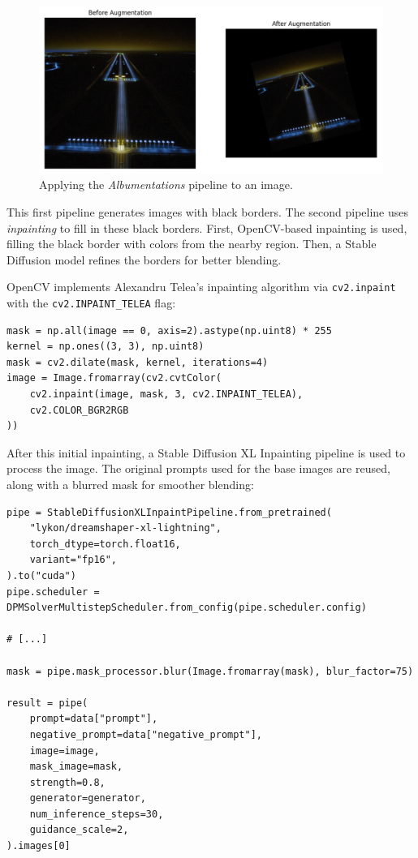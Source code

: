 \begin{figure}[htbp]
\centering
\includegraphics[width=1.0\textwidth]{figures/albumentations.png}
  \caption{Applying the \emph{Albumentations} pipeline to an image.}
\label{fig:noise_to_image}
\end{figure}

This first pipeline generates images with black borders. 
The second pipeline uses \emph{inpainting} to fill in these black borders. 
First, OpenCV-based inpainting is used, filling the black border with colors from the nearby region. 
Then, a Stable Diffusion model refines the borders for better blending.

OpenCV implements Alexandru Telea's inpainting algorithm \cite{telea_image_2004}
via \texttt{cv2.inpaint} with the \texttt{cv2.INPAINT\_TELEA} flag:

\begin{lstlisting}
mask = np.all(image == 0, axis=2).astype(np.uint8) * 255
kernel = np.ones((3, 3), np.uint8)
mask = cv2.dilate(mask, kernel, iterations=4)
image = Image.fromarray(cv2.cvtColor(
    cv2.inpaint(image, mask, 3, cv2.INPAINT_TELEA),
    cv2.COLOR_BGR2RGB
))
\end{lstlisting}

After this initial inpainting, a Stable Diffusion XL Inpainting pipeline is used to process the image. 
The original prompts used for the base images are reused, along with a blurred mask for smoother blending:

\begin{lstlisting}
pipe = StableDiffusionXLInpaintPipeline.from_pretrained(
    "lykon/dreamshaper-xl-lightning",
    torch_dtype=torch.float16,
    variant="fp16",
).to("cuda")
pipe.scheduler = DPMSolverMultistepScheduler.from_config(pipe.scheduler.config)

# [...]

mask = pipe.mask_processor.blur(Image.fromarray(mask), blur_factor=75)

result = pipe(
    prompt=data["prompt"],
    negative_prompt=data["negative_prompt"],
    image=image,
    mask_image=mask,
    strength=0.8,
    generator=generator,
    num_inference_steps=30,
    guidance_scale=2,
).images[0]
\end{lstlisting}

